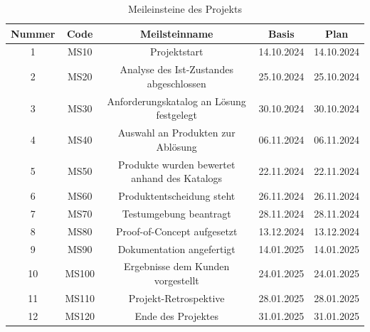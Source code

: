\documentclass[ThesisDJ.tex]{subfiles}
\begin{document}
\begin{table}[h]
  \centering
\begin{tabular}{|c|c|c|c|c|}
  \hline
  Nummer & Code & Meilsteinname & Basis & Plan \\
  \hline
  1 & MS10 & Projektstart & 14.10.2024 & 14.10.2024 \\
  \hline
  2 & MS20 & Analyse des Ist-Zustandes abgeschlossen & 25.10.2024 & 25.10.2024 \\
  \hline
  3 & MS30 & Anforderungskatalog an Lösung festgelegt & 30.10.2024 & 30.10.2024 \\
  \hline
  4 & MS40 & Auswahl an Produkten zur Ablösung & 06.11.2024 & 06.11.2024 \\
  \hline
  5 & MS50 & Produkte wurden bewertet anhand des Katalogs & 22.11.2024 & 22.11.2024 \\
  \hline
  6 & MS60 & Produktentscheidung steht & 26.11.2024 & 26.11.2024 \\
  \hline
  7 & MS70 & Testumgebung beantragt & 28.11.2024 & 28.11.2024 \\
  \hline
  8 & MS80 & Proof-of-Concept aufgesetzt & 13.12.2024 & 13.12.2024 \\
  \hline
  9 & MS90 & Dokumentation angefertigt & 14.01.2025 & 14.01.2025 \\
  \hline
  10 & MS100 & Ergebnisse dem Kunden vorgestellt & 24.01.2025 & 24.01.2025 \\
  \hline
  11 & MS110 & Projekt-Retrospektive & 28.01.2025 & 28.01.2025 \\
  \hline
  12 & MS120 & Ende des Projektes & 31.01.2025 & 31.01.2025 \\
  \hline
\end{tabular}

\caption{Meileinsteine des Projekts}
\label{tab:milestones}

\end{table}
\end{document}

